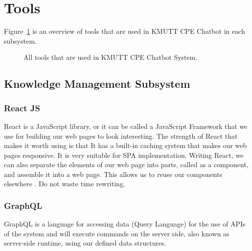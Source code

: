 \documentclass[12pt,oneside,openright,a4paper]{cpe-english-project}
\begin{document}
\section{Tools}
Figure~\ref*{fig:ch3_tools} is an overview of tools that are used in KMUTT CPE Chatbot in each subsystem.
\begin{figure}[h!]
  \centering
  \setlength{\fboxrule}{0.2mm}
  \setlength{\fboxsep}{0.5cm}
  \caption{All tools that are used in KMUTT CPE Chatbot System.}
  \label{fig:ch3_tools}
\end{figure}

\subsection{Knowledge Management Subsystem}
\subsubsection{React JS}
React is a JavaScript library, or it can be called a JavaScript Framework that we use for building
our web pages to look interesting. The strength of React that makes it worth using is that It has
a built-in caching system that makes our web pages responsive. It is very suitable for SPA
implementation. Writing React, we can also separate the elements of our web page into parts,
called as a component, and assemble it into a web page. This allows us to reuse our components
elsewhere \cite{what_is_react}. Do not waste time rewriting.

\subsubsection{GraphQL}
GraphQL is a language for accessing data (Query Language) for the use of APIs of the system \cite{what_is_graphql}
and will execute commands on the server side, also known as server-side runtime, using our defined
data structures.
\end{document}
